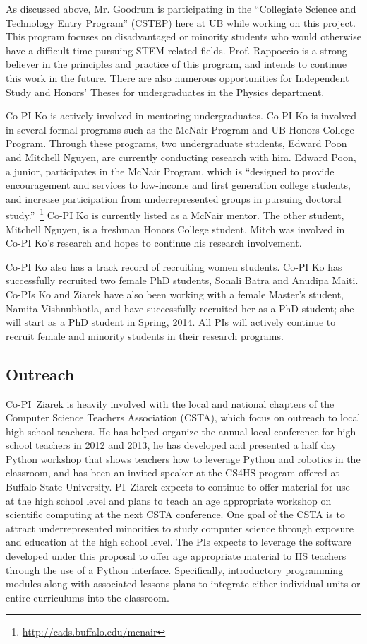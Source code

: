 \documentclass[times,11pt]{article}
\begin{document}
As discussed above, Mr. Goodrum is participating in the
``Collegiate Science and Technology Entry Program'' (CSTEP) here at
UB while working on this project. This program focuses on
disadvantaged or minority students who would otherwise have a
difficult time pursuing STEM-related fields. Prof. Rappoccio is a
strong believer in the principles and practice of this program, and
intends to continue this work in the future. 
There are also numerous opportunities for Independent Study and
Honors' Theses for undergraduates in the Physics department. 

Co-PI Ko is actively involved in mentoring undergraduates. Co-PI Ko is involved
in several formal programs such as the McNair Program and UB Honors College
Program. Through these programs, two undergraduate students, Edward Poon and
Mitchell Nguyen, are currently conducting research with him. Edward Poon, a
junior, participates in the McNair Program, which is ``designed to provide
encouragement and services to low-income and first generation college students,
and increase participation from underrepresented groups in pursuing doctoral
study.''~\footnote{\url{http://cads.buffalo.edu/mcnair}} Co-PI Ko is currently
listed as a McNair mentor. The other student, Mitchell Nguyen, is a freshman
Honors College student. Mitch was involved in Co-PI Ko's research and
hopes to continue his research involvement.

Co-PI Ko also has a track record of recruiting women students. Co-PI Ko has
successfully recruited two female PhD students, Sonali Batra and Anudipa
Maiti. Co-PIs Ko and Ziarek have also been working with a female Master's
student, Namita Vishnubhotla, and have successfully recruited her as a PhD
student; she will start as a PhD student in Spring, 2014. All PIs will
actively continue to recruit female and minority students in their research
programs.

\subsection{Outreach}
Co-PI~Ziarek is heavily involved with the local and national chapters of the Computer Science Teachers Association (CSTA), which
focus on outreach to local high school teachers. He has helped organize the annual local conference for high school teachers in
2012 and 2013, he has developed and presented a half day Python workshop that shows teachers how to leverage Python and
robotics in the classroom, and has been an invited speaker at the CS4HS program offered at Buffalo State University.
PI~Ziarek expects to continue to offer
material for use at the high school level and plans to teach an age appropriate  workshop on scientific computing at the next
CSTA conference. One goal of the CSTA is to attract underrepresented minorities to study computer science through
exposure and education at the high school level.  
The PIs expects to leverage the software developed under this proposal to offer age appropriate material to HS teachers 
through the use of a Python interface. Specifically,
introductory programming modules along with associated lessons plans to integrate either individual units or entire
curriculums into the classroom.
\end{document}
